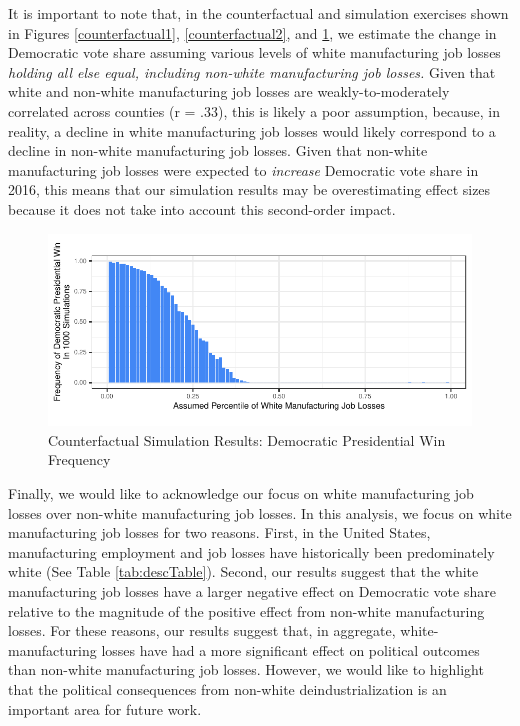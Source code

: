 \documentclass[]{AEA}
\begin{document}
It is important to note that, in the counterfactual and simulation
exercises shown in Figures \ref{counterfactual1}, \ref{counterfactual2},
and \ref{counterfactual3}, we estimate the change in Democratic vote
share assuming various levels of white manufacturing job losses
\emph{holding all else equal, including non-white manufacturing job
losses.} Given that white and non-white manufacturing job losses are
weakly-to-moderately correlated across counties (r = .33), this is
likely a poor assumption, because, in reality, a decline in white
manufacturing job losses would likely correspond to a decline in
non-white manufacturing job losses. Given that non-white manufacturing
job losses were expected to \emph{increase} Democratic vote share in
2016, this means that our simulation results may be overestimating
effect sizes because it does not take into account this second-order
impact.

\FloatBarrier
\begin{figure} \label{counterfactual3}
\caption{Counterfactual Simulation Results: Democratic Presidential Win Frequency}

\begin{center}\includegraphics{Final-Draft_files/figure-latex/unnamed-chunk-8-1} \end{center}



\FloatBarrier
\end{figure}
\FloatBarrier

Finally, we would like to acknowledge our focus on white manufacturing
job losses over non-white manufacturing job losses. In this analysis, we
focus on white manufacturing job losses for two reasons. First, in the
United States, manufacturing employment and job losses have historically
been predominately white (See Table \ref{tab:descTable}). Second, our
results suggest that the white manufacturing job losses have a larger
negative effect on Democratic vote share relative to the magnitude of
the positive effect from non-white manufacturing losses. For these
reasons, our results suggest that, in aggregate, white-manufacturing
losses have had a more significant effect on political outcomes than
non-white manufacturing job losses. However, we would like to highlight
that the political consequences from non-white deindustrialization is an
important area for future work.
\end{document}
